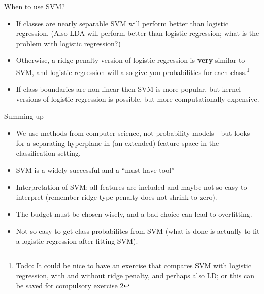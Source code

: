 \documentclass[10pt,ignorenonframetext,]{beamer}
\providecommand{\tightlist}{%
  \setlength{\itemsep}{0pt}\setlength{\parskip}{0pt}}
\begin{document}
\begin{frame}

\begin{block}{When to use SVM?}

\begin{itemize}
\item
  If classes are nearly separable SVM will perform better than logistic
  regression. (Also LDA will perform better than logistic regression;
  what is the problem with logistic regression?)
\item
  Otherwise, a ridge penalty version of logistic regression is
  \textbf{very} similar to SVM, and logistic regression will also give
  you probabilities for each
  class.\footnote{Todo: It could be nice to have an exercise that compares SVM with logistic regression, with and without ridge penalty, and perhaps also LD; or this can be saved for compulsory exercise 2}
\item
  If class boundaries are non-linear then SVM is more popular, but
  kernel versions of logistic regression is possible, but more
  computationally expensive.
\end{itemize}

\end{block}

\end{frame}

\begin{frame}{Summing up}

\begin{itemize}
\tightlist
\item
  We use methods from computer science, not probability models - but
  looks for a separating hyperplane in (an extended) feature space in
  the classification setting.
\item
  SVM is a widely successful and a ``must have tool''
\item
  Interpretation of SVM: all features are included and maybe not so easy
  to interpret (remember ridge-type penalty does not shrink to zero).
\item
  The budget must be chosen wisely, and a bad choice can lead to
  overfitting.
\item
  Not so easy to get class probabilites from SVM (what is done is
  actually to fit a logistic regression after fitting SVM).
\end{itemize}

\end{frame}
\end{document}
